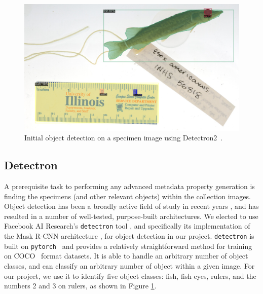 \documentclass[conference]{IEEEtran}
\begin{document}
\begin{figure}[b]
  \centering
  \includegraphics[width=.90\linewidth]{images/teaser2_crop}
  \caption{Initial object detection on a specimen image using Detectron2~\cite{wu2019detectron2}.}
  \label{fig:teaser}
\end{figure}

\subsection{Detectron}
A prerequisite task to performing any advanced metadata property generation
is finding the specimens (and other relevant objects) within the collection
images. Object detection has been a broadly active field of study in recent
years \cite{zou2019object}, and has resulted in a number of well-tested, purpose-built architectures. We elected to use Facebook AI Research's \verb|detectron| tool \cite{wu2019detectron2}, and specifically its implementation of the Mask R-CNN architecture \cite{he2018mask}, for object detection in our project.
\verb|detectron| is built on \verb|pytorch|~\cite{NEURIPS2019_9015} and provides a relatively straightforward method for training on COCO~\cite{DBLP:journals/corr/LinMBHPRDZ14} format datasets. It is able to handle an arbitrary number of object classes, and can classify an arbitrary number of object within a given image. 
For our project, we use it to identify five object classes: fish, fish eyes, rulers, and the numbers 2 and 3 on rulers,
as shown in Figure \ref{fig:teaser}.

\end{document}
